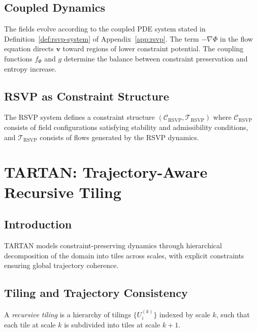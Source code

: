 \documentclass[11pt,openany]{book}
\begin{document}
\section{Coupled Dynamics}
\label{sec:dynamics}

The fields evolve according to the coupled PDE system
stated in Definition~\ref{def:rsvp-system} of
Appendix~\ref{app:rsvp}. The term $-\nabla\Phi$ in the
flow equation directs $\boldsymbol{v}$ toward regions of
lower constraint potential. The coupling functions $f_\Phi$
and $g$ determine the balance between constraint
preservation and entropy increase.

\section{RSVP as Constraint Structure}
\label{sec:interpretation-constraint}

\begin{proposition}
\label{prop:rsvp-constraint}
The RSVP system defines a constraint structure
$(\mathcal{C}_{\mathrm{RSVP}}, \mathcal{T}_{\mathrm{RSVP}})$
where $\mathcal{C}_{\mathrm{RSVP}}$ consists of field
configurations satisfying stability and admissibility
conditions, and $\mathcal{T}_{\mathrm{RSVP}}$ consists of
flows generated by the RSVP dynamics.
\end{proposition}


\chapter{TARTAN: Trajectory-Aware Recursive Tiling}
\label{ch:tartan}

\section{Introduction}
\label{sec:introduction-tartan}

TARTAN models constraint-preserving dynamics through
hierarchical decomposition of the domain into tiles across
scales, with explicit constraints ensuring global trajectory
coherence.

\section{Tiling and Trajectory Consistency}
\label{sec:tiling}

\begin{definition}
A \emph{recursive tiling} is a hierarchy of tilings
$\{U_i^{(k)}\}$ indexed by scale $k$, such that each tile
at scale $k$ is subdivided into tiles at scale $k+1$.
\end{definition}
\end{document}
